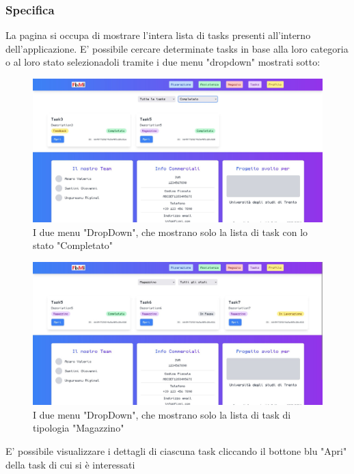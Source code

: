 \documentclass{report}
\begin{document}
\subsubsection*{Specifica}
La pagina si occupa di mostrare l'intera lista di tasks presenti all'interno dell'applicazione. E' possibile cercare determinate tasks in base alla loro categoria o al loro stato selezionadoli tramite i due menu "dropdown" mostrati sotto:\\
\begin{figure}[H]
	\centering\includegraphics[width=1\textwidth]{images/microservizio-task/frontend/dropdown1.jpg}
	\caption{I due menu "DropDown", che mostrano solo la lista di task con lo stato "Completato"}
\end{figure}
\begin{figure}[H]
	\centering\includegraphics[width=1\textwidth]{images/microservizio-task/frontend/dropdown2.jpg}
	\caption{I due menu "DropDown", che mostrano solo la lista di task di tipologia "Magazzino"}
\end{figure}
E' possibile visualizzare i dettagli di ciascuna task cliccando il bottone blu "Apri" della task di cui si è interessati\\
\end{document}

